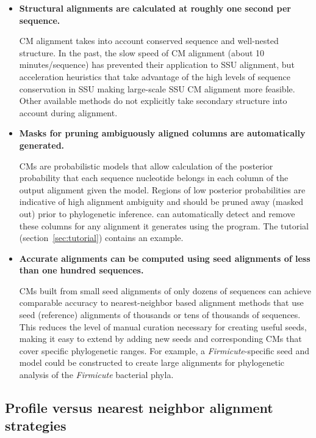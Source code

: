 \begin{itemize}

\item \textbf{Structural alignments are calculated at roughly one
  second per sequence.}  

  CM alignment takes into account conserved sequence and well-nested
  structure. In the past, the slow speed of CM alignment (about 10
  minutes/sequence) has prevented their application to SSU alignment,
  but acceleration heuristics that take advantage of the high levels
  of sequence conservation in SSU \cite{Nawrocki09b} making
  large-scale SSU CM alignment more feasible. Other available methods
  do not explicitly take secondary structure into account during
  alignment.

\item \textbf{Masks for pruning ambiguously aligned columns are
  automatically generated.}
  
  CMs are probabilistic models that allow calculation of the posterior
  probability that each sequence nucleotide belongs in each column of the
  output alignment given the model. Regions of low posterior
  probabilities are indicative of high alignment ambiguity and
  should be pruned away (masked out) prior to phylogenetic
  inference.  can automatically detect and remove
  these columns for any alignment it generates using the
   program. The tutorial (section~\ref{sec:tutorial})
  contains an example. 

\item \textbf{Accurate alignments can be computed using seed
  alignments of less than one hundred sequences.}

  CMs built from small seed alignments of only dozens of sequences
  can achieve comparable accuracy to nearest-neighbor based alignment
  methods that use seed (reference) alignments of thousands or tens of
  thousands of sequences. This reduces the level of manual curation
  necessary for creating useful seeds, making it easy to extend
   by adding new seeds and corresponding CMs that cover
  specific phylogenetic ranges. For example, a
  \emph{Firmicute}-specific seed and model could be constructed to
  create large alignments for phylogenetic analysis of the \emph{Firmicute}
  bacterial phyla.

\end{itemize}

\subsection{Profile versus nearest neighbor alignment strategies}

